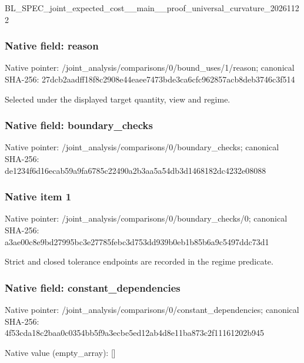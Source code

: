 \documentclass[10pt,a4paper]{article}
\begin{document}
BL\_SPEC\_joint\_expected\_c\allowbreak{}ost\_\_main\_\_proof\_univers\allowbreak{}al\_curvature\_20261122


\subsubsection{Native field: reason}


Native pointer: /joint\_analysis/comparis\allowbreak{}ons/0/bound\_uses/1/reaso\allowbreak{}n; canonical SHA-256: 27dcb2aadff18f8c2908e44e\allowbreak{}aee7473bde3ca6cfc962857a\allowbreak{}cb8deb3746c3f514


Selected under the displayed target quantity, view and regime.


\subsubsection{Native field: boundary\_checks}


Native pointer: /joint\_analysis/comparis\allowbreak{}ons/0/boundary\_checks; canonical SHA-256: de1234f6d16ecab59a9fa678\allowbreak{}5c22490a2b3aa5a54db3d146\allowbreak{}8182dc4232e08088



\subsubsection{Native item 1}


Native pointer: /joint\_analysis/comparis\allowbreak{}ons/0/boundary\_checks/0; canonical SHA-256: a3ae00c8e9bd27995bc3e277\allowbreak{}85febc3d753dd939b0eb1b85\allowbreak{}b6a9c5497ddc73d1


Strict and closed tolerance endpoints are recorded in the regime predicate.


\subsubsection{Native field: constant\_dependencies}


Native pointer: /joint\_analysis/comparis\allowbreak{}ons/0/constant\_dependenc\allowbreak{}ies; canonical SHA-256: 4f53cda18c2baa0c0354bb5f\allowbreak{}9a3ecbe5ed12ab4d8e11ba87\allowbreak{}3c2f11161202b945



Native value (empty\_array): []
\end{document}
